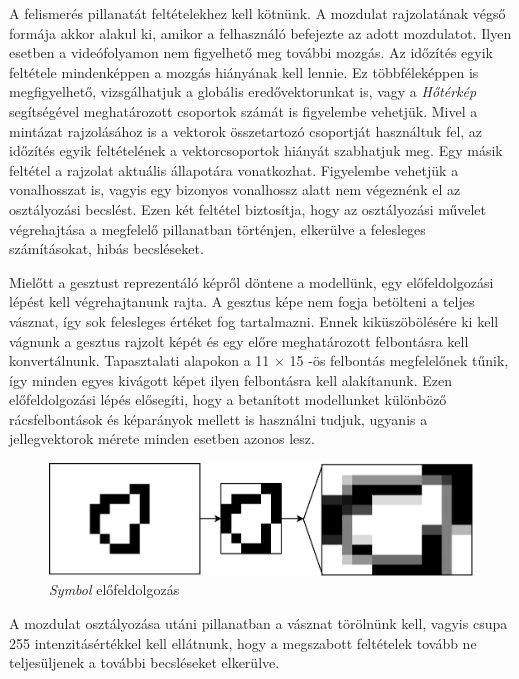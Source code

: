 A felismerés pillanatát feltételekhez kell kötnünk. A mozdulat rajzolatának végső formája akkor alakul ki, amikor a felhasználó befejezte az adott mozdulatot. Ilyen esetben a videófolyamon nem figyelhető meg további mozgás. Az időzítés egyik feltétele mindenképpen a mozgás hiányának kell lennie. Ez többféleképpen is megfigyelhető, vizsgálhatjuk a globális eredővektorunkat is, vagy a \textit{Hőtérkép} segítségével meghatározott csoportok számát is figyelembe vehetjük. Mivel a mintázat rajzolásához is a vektorok összetartozó csoportját használtuk fel, az időzítés egyik feltételének a vektorcsoportok hiányát szabhatjuk meg. Egy másik feltétel a rajzolat aktuális állapotára vonatkozhat. Figyelembe vehetjük a vonalhosszat is, vagyis egy bizonyos vonalhossz alatt nem végeznénk el az osztályozási becslést. Ezen két feltétel biztosítja, hogy az osztályozási művelet végrehajtása a megfelelő pillanatban történjen, elkerülve a felesleges számításokat, hibás becsléseket.

Mielőtt a gesztust reprezentáló képről döntene a modellünk, egy előfeldolgozási lépést kell végrehajtanunk rajta. A gesztus képe nem fogja betölteni a teljes vásznat, így sok felesleges értéket fog tartalmazni. Ennek kiküszöbölésére ki kell vágnunk a gesztus rajzolt képét és egy előre meghatározott felbontásra kell konvertálnunk. Tapasztalati alapokon a 11 $\times$ 15 -ös felbontás megfelelőnek tűnik, így minden egyes kivágott képet ilyen felbontásra kell alakítanunk. Ezen előfeldolgozási lépés elősegíti, hogy a betanított modellunket különböző rácsfelbontások és képarányok mellett is használni tudjuk, ugyanis a jellegvektorok mérete minden esetben azonos lesz.

\begin{figure}[h]
\centering
\includegraphics[width=10truecm]{images/crop_resize.png}
\caption{\textit{Symbol} előfeldolgozás}
\label{fig:symbol_pre}
\end{figure}

A mozdulat osztályozása utáni pillanatban a vásznat törölnünk kell, vagyis csupa 255 intenzitásértékkel kell ellátnunk, hogy a megszabott feltételek tovább ne teljesüljenek a további becsléseket elkerülve.


